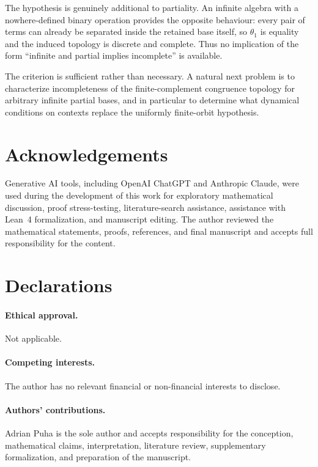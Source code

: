 \documentclass{birkau}
\theoremstyle{definition}
\theoremstyle{remark}
\begin{document}
The hypothesis is genuinely additional to partiality.  An infinite algebra
with a nowhere-defined binary operation provides the opposite behaviour: every
pair of terms can already be separated inside the retained base itself, so
$\theta_1$ is equality and the induced topology is discrete and complete.
Thus no implication of the form ``infinite and partial implies incomplete'' is
available.

The criterion is sufficient rather than necessary.  A natural next problem is
to characterize incompleteness of the finite-complement congruence topology for
arbitrary infinite partial bases, and in particular to determine what dynamical
conditions on contexts replace the uniformly finite-orbit hypothesis.

\section*{Acknowledgements}
Generative AI tools, including OpenAI ChatGPT and Anthropic Claude, were used
during the development of this work for exploratory mathematical discussion,
proof stress-testing, literature-search assistance, assistance with Lean~4
formalization, and manuscript editing.  The author reviewed the mathematical
statements, proofs, references, and final manuscript and accepts full
responsibility for the content.

\section*{Declarations}

\paragraph{Ethical approval.}
Not applicable.

\paragraph{Competing interests.}
The author has no relevant financial or non-financial interests to disclose.

\paragraph{Authors' contributions.}
Adrian Puha is the sole author and accepts responsibility for the conception,
mathematical claims, interpretation, literature review, supplementary
formalization, and preparation of the manuscript.
\end{document}

